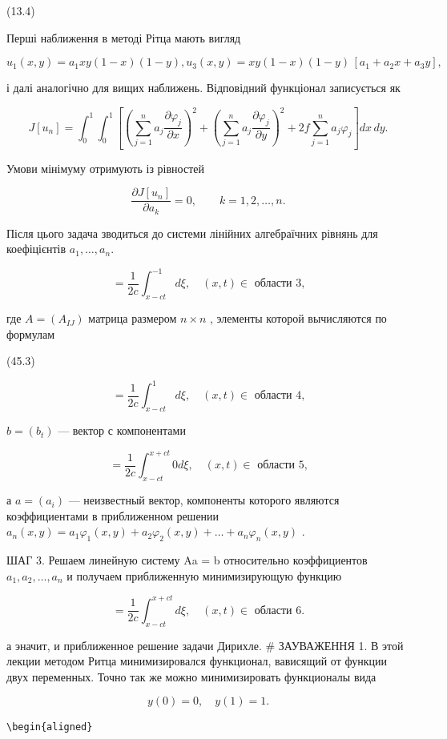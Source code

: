 \documentclass[
  ukrainian,
]{article}
\begin{document}
(13.4)

Перші наближення в методі Рітца мають вигляд

\[
u_1(x,y)=a_1xy(1-x)(1-y),
u_3(x,y)=xy(1-x)(1-y)\,[a_1+a_2x+a_3y],
\]

і далі аналогічно для вищих наближень. Відповідний функціонал
записується як

\[
J[u_n] = \int_0^1 \int_0^1 \left[\left(\sum_{j=1}^n a_j \frac{\partial \varphi_j}{\partial x}\right)^2 + \left(\sum_{j=1}^n a_j \frac{\partial \varphi_j}{\partial y}\right)^2 + 2f\sum_{j=1}^n a_j\varphi_j\right] dx\,dy.
\]

Умови мінімуму отримують із рівностей

\[
\frac{\partial J[u_n]}{\partial a_k}=0, \qquad k=1,2,\ldots,n.
\]

Після цього задача зводиться до системи лінійних алгебраїчних рівнянь
для коефіцієнтів \(a_1,\ldots,a_n\).

\[
= \frac{1}{2c} \int_{x-ct}^{-1} d\xi, \quad (x, t) \in \text{ области 3,}
\]

где \(A = (A_{IJ})\) матрица размером \(n \times n\) , элементы которой
вычисляются по формулам

(45.3)

\[
= \frac{1}{2c} \int_{x-ct}^{1} d\xi, \quad (x, t) \in \text{ области 4,}
\]

\(b = (b_t)\) --- вектор с компонентами

\[
= \frac{1}{2c} \int_{x-ct}^{x+ct} 0 d\xi, \quad (x, t) \in \text{ области 5,}
\]

а \(a=(a_i)\) --- неизвестный вектор, компоненты которого являются
коэффициентами в приближенном решении
\(a_n(x,y)=a_1\varphi_1(x,y)+a_2\varphi_2(x,y)+\ldots+a_n\varphi_n(x,y)\)
.

ШАГ 3. Решаем линейную систему Aa = b относительно коэффициентов
\(a_1, a_2, \ldots, a_n\) и получаем приближенную минимизирующую функцию

\[
= \frac{1}{2c} \int_{x-ct}^{x+ct} d\xi, \quad (x, t) \in \text{ области 6.}
\]

а эначит, и приближенное решение задачи Дирихле. \# ЗАУВАЖЕННЯ 1. В этой
лекции методом Ритца минимизировался функционал, вависящий от функции
двух переменных. Точно так же можно минимизировать функционалы вида

\[
y(0) = 0, \quad y(1) = 1.
\]

\begin{verbatim}
\begin{aligned}
\end{verbatim}
\end{document}
